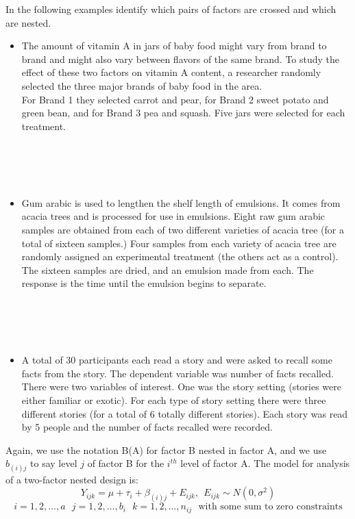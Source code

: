 In the following examples identify which pairs of factors are crossed and which are nested.
\begin{itemize}
\item The amount of vitamin A in jars of baby food might vary from brand to brand and might also vary between flavors of the same brand. To study the effect of these two factors on vitamin A content, a researcher randomly selected the three major brands of baby food in the area.\\
For Brand 1 they selected carrot and pear, for Brand 2 sweet potato and green bean, and for Brand 3 pea and squash.   Five jars were selected for each treatment.\\~\\~\\~\\~\\
\item Gum arabic is used to lengthen the shelf length of emulsions. It comes from acacia trees and is processed for use in emulsions. Eight raw gum arabic samples are obtained from each of two different varieties of acacia tree (for a total of sixteen samples.)  Four samples from each variety of acacia tree are randomly assigned an experimental treatment (the others act as a control).  The sixteen samples are dried, and an emulsion made from each. The response is the time until the emulsion begins to separate.\\~\\~\\~\\~\\
\item A total of 30 participants each read a story and were asked to recall some facts from the story. The dependent variable was number of facts recalled. There were two variables of interest.  One was the story setting (stories were either familiar or exotic).  For each type of story setting there were three different stories (for a total of 6 totally different stories).  Each story was read by 5 people and the number of facts recalled were recorded.
\end{itemize}
\newpage
Again, we use the notation B(A) for factor B nested in factor A, and we use $b_{(i)j}$ to say level $j$ of factor B for the $i^{th}$ level of factor A.  The model for analysis of a two-factor nested design is:
$$Y_{ijk}=\mu+\tau_i+\beta_{(i)j}+E_{ijk},~~E_{ijk}\sim N(0,\sigma^2)$$
$$i=1,2,\ldots,a ~~~j=1,2,\ldots,b_{i} ~~~k=1,2,\ldots,n_{ij}~~~\mbox{with some sum to zero constraints}$$
